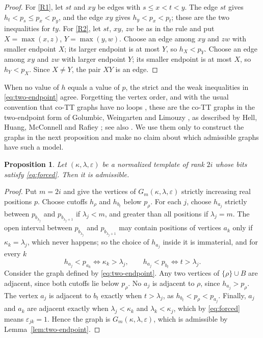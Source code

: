 \documentclass[11pt]{amsart}
\newtheorem{proposition}[theorem]{Proposition}
\theoremstyle{definition}
\theoremstyle{remark}
\numberwithin{equation}{section}
\begin{document}
\begin{proof}
For \ref{R1}, let $st$ and $xy$ be edges with $s\le x<t<y$. The edge $st$ gives $h_t<p_s\le p_x<p_y$, and the edge $xy$ gives $h_y<p_x<p_t$; these are the two inequalities for $ty$. For \ref{R2}, let $st$, $xy$, $zw$ be as in the rule and put $X=\max(x,z)$, $Y=\max(y,w)$. Choose an edge among $xy$ and $zw$ with smaller endpoint $X$; its larger endpoint is at most $Y$, so $h_X<p_Y$. Choose an edge among $xy$ and $zw$ with larger endpoint $Y$; its smaller endpoint is at most $X$, so $h_Y<p_X$. Since $X\ne Y$, the pair $XY$ is an edge.
\end{proof}

When no value of $h$ equals a value of $p$, the strict and the weak inequalities in \eqref{eq:two-endpoint} agree. Forgetting the vertex order, and with the usual convention that co-TT graphs have no loops \cite[Section~2]{HHMR}, these are the co-TT graphs in the two-endpoint form of Golumbic, Weingarten and Limouzy \cite{GWL}, as described by Hell, Huang, McConnell and Rafiey \cite[Section~1]{HHMR}; see also \cite{HHMR-SIAM}. We use them only to construct the graphs in the next proposition and make no claim about which admissible graphs have such a model.

\begin{proposition}\label{prop:existence}
Let $(\kappa,\lambda,\varepsilon)$ be a normalized template of rank $2i$ whose bits satisfy \eqref{eq:forced}. Then it is admissible.
\end{proposition}

\begin{proof}
Put $m=2i$ and give the vertices of $G_m(\kappa,\lambda,\varepsilon)$ strictly increasing real positions $p$. Choose cutoffs $h_\rho$ and $h_{b_t}$ below $p_\rho$. For each $j$, choose $h_{a_j}$ strictly between $p_{b_{\lambda_j}}$ and $p_{b_{\lambda_j+1}}$ if $\lambda_j<m$, and greater than all positions if $\lambda_j=m$. The open interval between $p_{b_{\lambda_j}}$ and $p_{b_{\lambda_j+1}}$ may contain positions of vertices $a_k$ only if $\kappa_k=\lambda_j$, which never happens; so the choice of $h_{a_j}$ inside it is immaterial, and for every $k$
\[
h_{a_j}<p_{a_k}\iff\kappa_k>\lambda_j,\qquad h_{a_j}<p_{b_t}\iff t>\lambda_j.
\]
Consider the graph defined by \eqref{eq:two-endpoint}. Any two vertices of $\{\rho\}\cup B$ are adjacent, since both cutoffs lie below $p_\rho$. No $a_j$ is adjacent to $\rho$, since $h_{a_j}>p_\rho$. The vertex $a_j$ is adjacent to $b_t$ exactly when $t>\lambda_j$, as $h_{b_t}<p_\rho<p_{a_j}$. Finally, $a_j$ and $a_k$ are adjacent exactly when $\lambda_j<\kappa_k$ and $\lambda_k<\kappa_j$, which by \eqref{eq:forced} means $\varepsilon_{jk}=1$. Hence the graph is $G_m(\kappa,\lambda,\varepsilon)$, which is admissible by Lemma~\ref{lem:two-endpoint}.
\end{proof}
\end{document}
